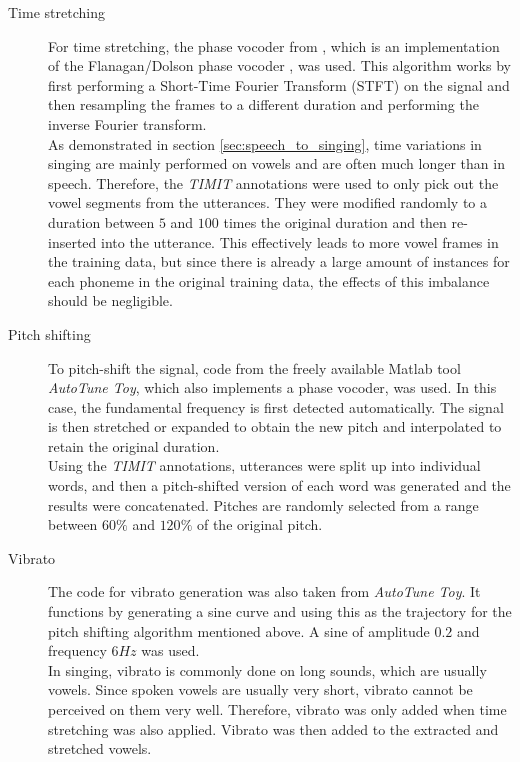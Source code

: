 \begin{description}
 \item[Time stretching] For time stretching, the phase vocoder from \cite{ellis_pvoc}, which is an implementation of the Flanagan/Dolson phase vocoder \cite{flanagan}\cite{dolson}, was used. This algorithm works by first performing a Short-Time Fourier Transform (STFT) on the signal and then resampling the frames to a different duration and performing the inverse Fourier transform.\\
 As demonstrated in section \ref{sec:speech_to_singing}, time variations in singing are mainly performed on vowels and are often much longer than in speech. Therefore, the \textit{TIMIT} annotations were used to only pick out the vowel segments from the utterances. They were modified randomly to a duration between $5$ and $100$ times the original duration and then re-inserted into the utterance. This effectively leads to more vowel frames in the training data, but since there is already a large amount of instances for each phoneme in the original training data, the effects of this imbalance should be negligible. 
 \item[Pitch shifting] To pitch-shift the signal, code from the freely available Matlab tool \textit{AutoTune Toy}\cite{autotunetoy}, which also implements a phase vocoder, was used. In this case, the fundamental frequency is first detected automatically. The signal is then stretched or expanded to obtain the new pitch and interpolated to retain the original duration.\\
 Using the \textit{TIMIT} annotations, utterances were split up into individual words, and then a pitch-shifted version of each word was generated and the results were concatenated. Pitches are randomly selected from a range between $60\%$ and $120\%$ of the original pitch.
 \item[Vibrato] The code for vibrato generation was also taken from \textit{AutoTune Toy}. It functions by generating a sine curve and using this as the trajectory for the pitch shifting algorithm mentioned above. A sine of amplitude $0.2$ and frequency $6 Hz$ was used.\\
 In singing, vibrato is commonly done on long sounds, which are usually vowels. Since spoken vowels are usually very short, vibrato cannot be perceived on them very well. Therefore, vibrato was only added when time stretching was also applied. Vibrato was then added to the extracted and stretched vowels.
\end{description}




